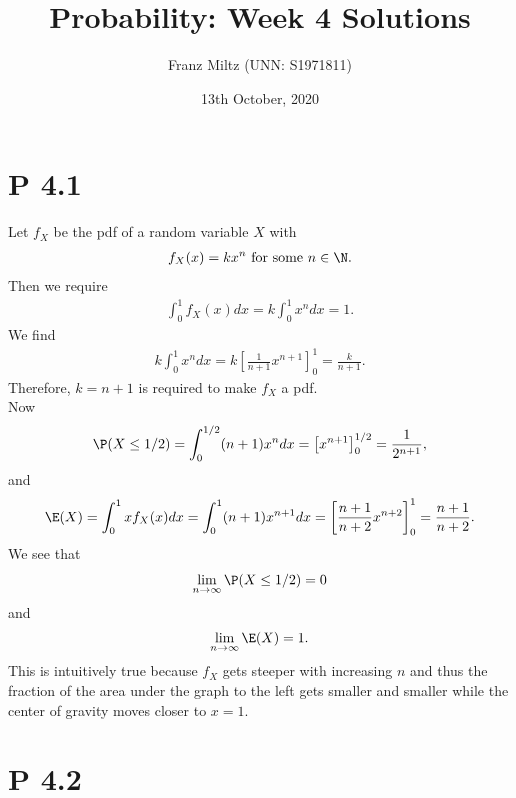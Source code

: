 \documentclass{article}
\begin{document}
\title{Probability: Week 4 Solutions}
\author{Franz Miltz (UNN: S1971811)}
\date{13th October, 2020}
\maketitle


\section*{P 4.1}


Let $f_X$ be the pdf of a random variable $X$ with
\begin{align*}
  f_X(x) = k x^n \text{ for some } n\in\N.
\end{align*}
Then we require
\begin{align*}
  \int_0^1 f_X(x) dx = k\int_0^1 x^n dx = 1.
\end{align*}
We find
\begin{align*}
  k\int_0^1 x^n dx = k\left[\frac{1}{n+1}x^{n+1}\right]_0^1 = \frac{k}{n+1}.
\end{align*}
Therefore, $k=n+1$ is required to make $f_X$ a pdf.\\
Now
\begin{align*}
  \P(X\leq 1/2) = \int_0^{1/2} (n+1)x^n dx = \left[x^{n+1}\right]_0^{1/2}
  =\frac{1}{2^{n+1}},
\end{align*}
and
\begin{align*}
  \E(X) = \int_0^1 x f_X(x) dx = \int_0^1 (n+1)x^{n+1} dx
  = \left[\frac{n+1}{n+2}x^{n+2}\right]_0^1 = \frac{n+1}{n+2}.
\end{align*}
We see that
\begin{align*}
  \lim_{n\to\infty} \P(X\leq 1/2) = 0
\end{align*}
and
\begin{align*}
  \lim_{n\to\infty} \E(X) = 1.
\end{align*}
This is intuitively true because $f_X$ gets steeper with increasing
$n$ and thus the fraction of the area under the graph to the left
gets smaller and smaller while the center of gravity moves closer to
$x=1$.


\section*{P 4.2}
\end{document}
